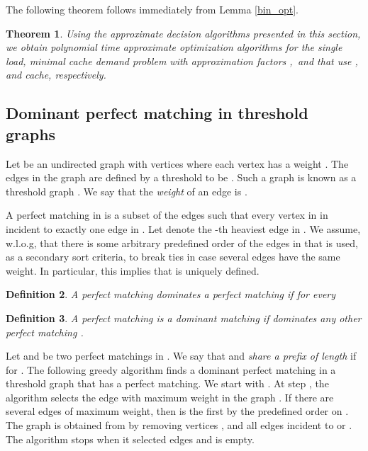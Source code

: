 \documentclass[11pt]{article}
\newtheorem{theorem}{Theorem}[section]
\newtheorem{definition}[theorem]{Definition}
\begin{document}
The following theorem follows immediately from Lemma \ref{bin_opt}.

\begin{theorem}
Using the approximate decision algorithms presented in this section, we obtain polynomial time approximate optimization algorithms for the single load, minimal cache demand problem with approximation factors ,\, and  that use ,  and  cache,  respectively.
\end{theorem}

\subsection{Dominant perfect matching in threshold graphs}\label{threshold_dominant}

Let  be an undirected graph with  vertices where each vertex  has a weight . The edges in the graph are defined by a threshold  to be . Such a graph  is known as a threshold graph \cite{CH73,MP95}. We say that the \textit{weight} of an edge  is .

A perfect matching  in  is a subset of the edges such that every vertex in  in incident to exactly one edge in .
Let  denote the -th heaviest edge in . We assume, w.l.o.g, that there is some arbitrary predefined order of the edges in  that is used, as a secondary sort criteria, to break ties in case several edges have the same weight. In particular, this implies that  is uniquely defined.

\begin{definition}
A perfect matching  dominates a perfect matching  if for every  
\end{definition}

\begin{definition}
A perfect matching  is a dominant matching if  dominates any other perfect matching .
\end{definition}

Let  and  be two perfect matchings in .
We say that  and  \textit{share a prefix of length } if  for .
The following greedy algorithm finds a dominant perfect matching in a threshold graph  that has a perfect matching.
We start with .
At step , the algorithm selects the edge  with maximum weight in the graph . If there are several edges of maximum weight, then  is the first by the predefined order on .
The graph  is obtained from  by removing vertices ,  and all edges incident to  or .
The algorithm stops when it selected  edges and  is empty.
\end{document}
